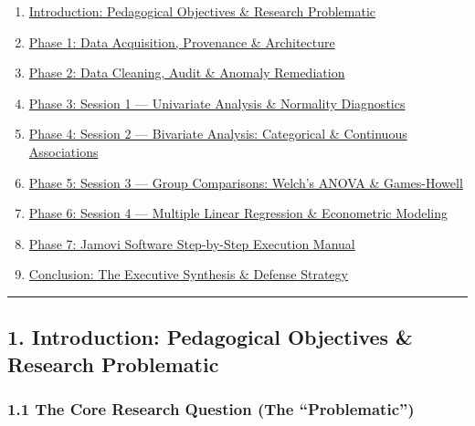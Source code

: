 \documentclass[
]{article}
\providecommand{\tightlist}{%
  \setlength{\itemsep}{0pt}\setlength{\parskip}{0pt}}
\begin{document}
\begin{enumerate}
\def\labelenumi{\arabic{enumi}.}
\tightlist
\item
  \hyperref[1-introduction-pedagogical-objectives--research-problematic]{Introduction:
  Pedagogical Objectives \& Research Problematic}
\item
  \hyperref[2-phase-1-data-acquisition-provenance--architecture]{Phase
  1: Data Acquisition, Provenance \& Architecture}
\item
  \hyperref[3-phase-2-data-cleaning-audit--anomaly-remediation]{Phase 2:
  Data Cleaning, Audit \& Anomaly Remediation}
\item
  \hyperref[4-phase-3-session-1--univariate-analysis--normality-diagnostics]{Phase
  3: Session 1 --- Univariate Analysis \& Normality Diagnostics}
\item
  \hyperref[5-phase-4-session-2--bivariate-analysis-categorical--continuous-associations]{Phase
  4: Session 2 --- Bivariate Analysis: Categorical \& Continuous
  Associations}
\item
  \hyperref[6-phase-5-session-3--group-comparisons-welchs-anova--games-howell]{Phase
  5: Session 3 --- Group Comparisons: Welch's ANOVA \& Games-Howell}
\item
  \hyperref[7-phase-6-session-4--multiple-linear-regression--econometric-modeling]{Phase
  6: Session 4 --- Multiple Linear Regression \& Econometric Modeling}
\item
  \hyperref[8-phase-7-jamovi-software-step-by-step-execution-manual]{Phase
  7: Jamovi Software Step-by-Step Execution Manual}
\item
  \hyperref[9-conclusion-the-executive-synthesis--defense-strategy]{Conclusion:
  The Executive Synthesis \& Defense Strategy}
\end{enumerate}

\begin{center}\rule{0.5\linewidth}{0.5pt}\end{center}

\subsection{1. Introduction: Pedagogical Objectives \& Research
Problematic}\label{introduction-pedagogical-objectives-research-problematic}

\subsubsection{1.1 The Core Research Question (The
``Problematic'')}\label{the-core-research-question-the-problematic}
\end{document}
